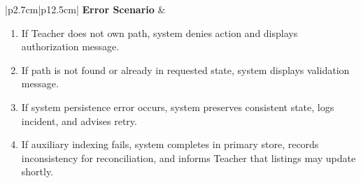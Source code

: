 \begin{table}[H]
\begin{tabular}{|p{2.7cm}|p{12.5cm}|}
        \textbf{Error Scenario} &
        \begin{minipage}[t]{\linewidth}
        \begin{enumerate}[topsep=0pt,itemsep=1pt,parsep=0pt,partopsep=0pt]
            \item If Teacher does not own path, system denies action and displays authorization message.
            \item If path is not found or already in requested state, system displays validation message.
            \item If system persistence error occurs, system preserves consistent state, logs incident, and advises retry.
            \item If auxiliary indexing fails, system completes in primary store, records inconsistency for reconciliation, and informs Teacher that listings may update shortly.
        \end{enumerate}
        \end{minipage} \\ \hline
    \end{tabular}
    \label{tab:teacher-archive-restore-tp}
\end{table}

